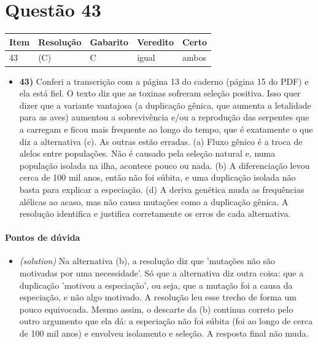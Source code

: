 \documentclass{article}%
\begin{document}
\section*{Questão 43}%
\begin{longtable}{@{}p{} p{} p{} p{} p{}@{}}\toprule Item & Resolução & Gabarito & Veredito & Certo \\ \midrule
43 & (C) & C & igual & ambos \\
\bottomrule\end{longtable}%
\begin{itemize}%
\item%
\textbf{43)} Conferi a transcrição com a página 13 do caderno (página 15 do PDF) e ela está fiel. O texto diz que as toxinas sofreram seleção positiva. Isso quer dizer que a variante vantajosa (a duplicação gênica, que aumenta a letalidade para as aves) aumentou a sobrevivência e/ou a reprodução das serpentes que a carregam e ficou mais frequente ao longo do tempo, que é exatamente o que diz a alternativa (c). As outras estão erradas. (a) Fluxo gênico é a troca de alelos entre populações. Não é causado pela seleção natural e, numa população isolada na ilha, acontece pouco ou nada. (b) A diferenciação levou cerca de 100 mil anos, então não foi súbita, e uma duplicação isolada não basta para explicar a especiação. (d) A deriva genética muda as frequências alélicas ao acaso, mas não causa mutações como a duplicação gênica. A resolução identifica e justifica corretamente os erros de cada alternativa.%
\end{itemize}%
\paragraph{Pontos de dúvida}%
\begin{itemize}%
\item%
\textit{(solution)} Na alternativa (b), a resolução diz que 'mutações não são motivadas por uma necessidade'. Só que a alternativa diz outra coisa: que a duplicação 'motivou a especiação', ou seja, que a mutação foi a causa da especiação, e não algo motivado. A resolução leu esse trecho de forma um pouco equivocada. Mesmo assim, o descarte da (b) continua correto pelo outro argumento que ela dá: a especiação não foi súbita (foi ao longo de cerca de 100 mil anos) e envolveu isolamento e seleção. A resposta final não muda.%
\end{itemize}%
\end{document}
